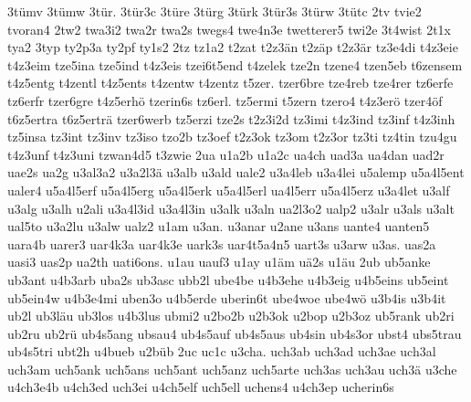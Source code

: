 {    3tümv
    3tümw
    3tür.
    3tür3c
    3türe
    3türg
    3türk
    3tür3s
    3türw
    3tütc
    2tv
    tvie2
    tvoran4
    2tw2
    twa3i2
    twa2r
    twa2s
    twegs4
    twe4n3e
    twetterer5
    twi2e
    3t4wist
    2t1x
    tya2
    3typ
    ty2p3a
    ty2pf
    ty1s2
    2tz
    tz1a2
    t2zat
    t2z3än
    t2zäp
    t2z3är
    tz3e4di
    t4z3eie
    t4z3eim
    tze5ina
    tze5ind
    t4z3eis
    tzei6t5end
    t4zelek
    tze2n
    tzene4
    tzen5eb
    t6zensem
    t4z5entg
    t4zentl
    t4z5ents
    t4zentw
    t4zentz
    t5zer.
    tzer6bre
    tze4reb
    tze4rer
    tz6erfe
    tz6erfr
    tzer6gre
    t4z5erhö
    tzerin6s
    tz6erl.
    tz5ermi
    t5zern
    tzero4
    t4z3erö
    tzer4öf
    t6z5ertra
    t6z5erträ
    tzer6werb
    tz5erzi
    tze2s
    t2z3i2d
    tz3imi
    t4z3ind
    tz3inf
    t4z3inh
    tz5insa
    tz3int
    tz3inv
    tz3iso
    tzo2b
    tz3oef
    t2z3ok
    tz3om
    t2z3or
    tz3ti
    tz4tin
    tzu4gu
    t4z3unf
    t4z3uni
    tzwan4d5
    t3zwie
    2ua
    u1a2b
    u1a2c
    ua4ch
    uad3a
    ua4dan
    uad2r
    uae2s
    ua2g
    u3al3a2
    u3a2l3ä
    u3alb
    u3ald
    uale2
    u3a4leb
    u3a4lei
    u5alemp
    u5a4l5ent
    ualer4
    u5a4l5erf
    u5a4l5erg
    u5a4l5erk
    u5a4l5erl
    ua4l5err
    u5a4l5erz
    u3a4let
    u3alf
    u3alg
    u3alh
    u2ali
    u3a4l3id
    u3a4l3in
    u3alk
    u3aln
    ua2l3o2
    ualp2
    u3alr
    u3als
    u3alt
    ual5to
    u3a2lu
    u3alw
    ualz2
    u1am
    u3an.
    u3anar
    u2ane
    u3ans
    uante4
    uanten5
    uara4b
    uarer3
    uar4k3a
    uar4k3e
    uark3s
    uar4t5a4n5
    uart3s
    u3arw
    u3as.
    uas2a
    uasi3
    uas2p
    ua2th
    uati6ons.
    u1au
    uauf3
    u1ay
    u1äm
    uä2s
    u1äu
    2ub
    ub5anke
    ub3ant
    u4b3arb
    uba2s
    ub3asc
    ubb2l
    ube4be
    u4b3ehe
    u4b3eig
    u4b5eins
    ub5eint
    ub5ein4w
    u4b3e4mi
    uben3o
    u4b5erde
    uberin6t
    ube4woe
    ube4wö
    u3b4is
    u3b4it
    ub2l
    ub3läu
    ub3los
    u4b3lus
    ubmi2
    u2bo2b
    u2b3ok
    u2bop
    u2b3oz
    ub5rank
    ub2ri
    ub2ru
    ub2rü
    ub4s5ang
    ubsau4
    ub4s5auf
    ub4s5aus
    ub4sin
    ub4s3or
    ubst4
    ubs5trau
    ub4s5tri
    ubt2h
    u4bueb
    u2büb
    2uc
    uc1c
    u3cha.
    uch3ab
    uch3ad
    uch3ae
    uch3al
    uch3am
    uch5ank
    uch5ans
    uch5ant
    uch5anz
    uch5arte
    uch3as
    uch3au
    uch3ä
    u3che
    u4ch3e4b
    u4ch3ed
    uch3ei
    u4ch5elf
    uch5ell
    uchens4
    u4ch3ep
    ucherin6s
}
